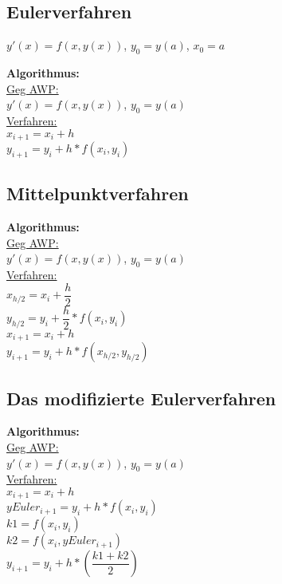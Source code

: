 \documentclass[../ZF_HM2.tex]{subfiles}
\begin{document}
\subsection{Eulerverfahren}
\colorbox{violet!30}{$y'(x) = f(x,y(x))$, $y_0 = y(a)$, $x_0=a$}

\begin{mdframed}
\textbf{Algorithmus:\\}
\underline{Geg AWP:}\\
$y'(x) = f(x,y(x))$, $y_0 = y(a)$\\
\underline{Verfahren:}\\
$x_{i+1}= x_i + h$\\
$y_{i+1} = y_i + h* f(x_i,y_i)$

\end{mdframed}

\subsection{Mittelpunktverfahren}
\begin{mdframed}
\textbf{Algorithmus:\\}
\underline{Geg AWP:}\\
$y'(x) = f(x,y(x))$, $y_0 = y(a)$\\
\underline{Verfahren:}\\
$x_{h/2}= x_i + \dfrac{h}{2}$\\
$y_{h/2}= y_i + \dfrac{h}{2}*f(x_i,y_i)$\\
$x_{i+1}= x_i + h$\\
$y_{i+1} = y_i + h* f(x_{h/2},y_{h/2})$

\end{mdframed}


\subsection{Das modifizierte Eulerverfahren}
\begin{mdframed}
\textbf{Algorithmus:\\}
\underline{Geg AWP:}\\
$y'(x) = f(x,y(x))$, $y_0 = y(a)$\\
\underline{Verfahren:}\\
$x_{i+1}= x_i + h$\\
$yEuler_{i+1} = y_i + h *f(x_i,y_i)$\\
$k1 = f(x_i,y_i)$\\
$k2 = f(x_i, yEuler_{i+1})$\\
$y_{i+1}  = y_i + h*(\dfrac{k1+k2}{2})$

\end{mdframed}
\end{document}

